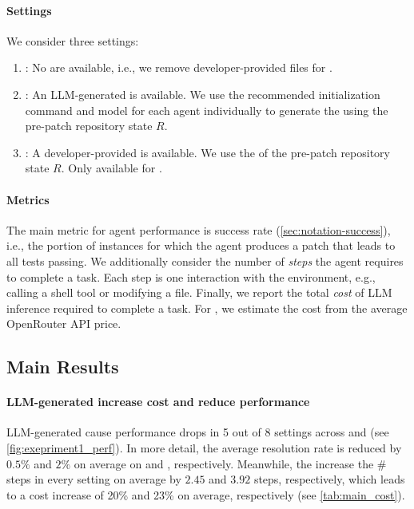 \paragraph{Settings}
We consider three \agentsmd{} settings:
\begin{enumerate}
    \vspace{-2mm}
    \item[]\hspace{-2mm}\noplan{}: No \agentsmds{} are available, i.e., we remove developer-provided files for \planbench{}.
    \item[]\hspace{-2mm}\autoplan{}: An LLM-generated \agentsmd{} is available. We use the recommended initialization command and model for each agent individually to generate the \agentsmd{} using the pre-patch repository state $R$.
    \item[]\hspace{-2mm}\humanplan{}: A developer-provided \agentsmd{} is available. We use the \agentsmd{} of the pre-patch repository state $R$. Only available for \planbench{}.
\end{enumerate}

\paragraph{Metrics}
The main metric for agent performance is success rate (\cref{sec:notation-success}), i.e., the portion of instances for which the agent produces a patch that leads to all tests passing. 
We additionally consider the number of \emph{steps} the agent requires to complete a task. 
Each step is one interaction with the environment, e.g., calling a shell tool or modifying a file. 
Finally, we report the total \emph{cost} of LLM inference required to complete a task.
For \qwen{}, we estimate the cost from the average OpenRouter API price.

\subsection{Main Results}
\label{sec:eval:main}





\paragraph{LLM-generated \agentsmds{} increase cost and reduce performance}
LLM-generated \agentsmds{} cause performance drops in 5 out of 8 settings across \swebench{} and \planbench{} (see \cref{fig:exepriment1_perf}).
In more detail, the average resolution rate is reduced by $0.5\%$ and $2\%$ on average on \swebench{} and \planbench{}, respectively.
Meanwhile, the \agentsmds{} increase the \# steps in every setting on average by $2.45$ and $3.92$ steps, respectively, which leads to a cost increase of 20\% and 23\% on average, respectively (see \cref{tab:main_cost}).


